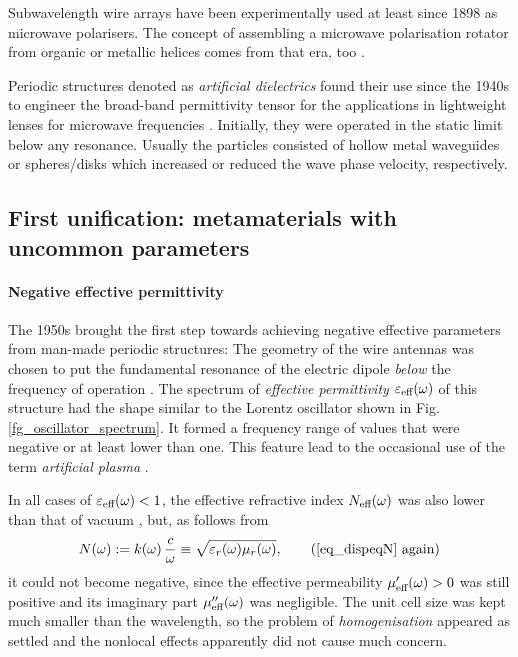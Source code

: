 Subwavelength wire arrays have been experimentally used at least since 1898 as microwave polarisers. The concept of assembling a microwave polarisation rotator from organic or metallic helices comes from that era, too \cite{bose1898rotation, emerson}.

Periodic structures denoted as \textit{artificial dielectrics} \cite{brown1955properties} found their use since the 1940s to engineer the broad-band permittivity tensor for the applications in lightweight lenses for microwave frequencies \cite{kock1948metallic}. Initially, they were operated in the static limit below any resonance. Usually the particles consisted of hollow metal waveguides or spheres/disks which increased or reduced the wave phase velocity, respectively. 


\subsection{First unification: metamaterials with uncommon parameters} 
\paragraph{Negative effective permittivity} %
The 1950s brought the first step towards achieving negative effective parameters from man-made periodic structures: The geometry of the wire antennas was chosen to put the fundamental resonance of the electric dipole \textit{below} the frequency of operation \cite{rotman1962plasma,boardman2005negative}. The spectrum of \textit{effective permittivity} $\varepsilon_{\text{eff} }(\omega)$ of this structure had the shape similar to the Lorentz oscillator shown in Fig. \ref{fg_oscillator_spectrum}. It formed a frequency range of values that were negative or at least lower than one. This feature lead to the occasional use of the term \textit{artificial plasma} \cite{merkel1973simulation}. 

In all cases of $\varepsilon_{\text{eff} }(\omega)<1$, the effective refractive index $N_{\text{eff} }(\omega)$ was also lower than that of vacuum \cite{brown1953artificial}, but, as follows from
\begin{equation} N(\omega) := k(\omega) \, \frac{c}{\omega} \equiv \sqrt{\epsrl(\omega)\murl(\omega)}, \tag{\ref{eq_dispeqN} \again} \end{equation}
	it could not become negative, since the effective permeability $\mu_{\text{eff} }'(\omega) > 0$ was still positive and its imaginary part $\mu_{\text{eff} }''(\omega)$ was negligible. The unit cell size was kept much smaller than the wavelength, so the problem of \textit{homogenisation} appeared as settled and the nonlocal effects apparently did not cause much concern.

